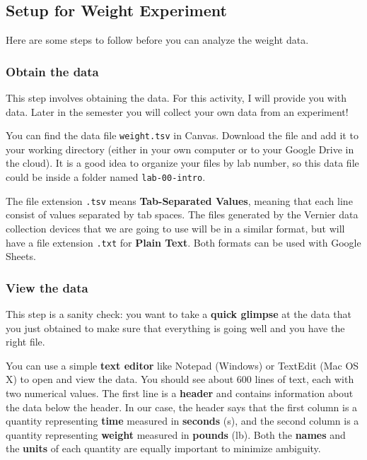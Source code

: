 \subsection{Setup for Weight Experiment}
Here are some steps to follow before you can analyze the weight data.
\subsubsection{Obtain the data}
This step involves obtaining the data. For this activity, I will provide you with data. Later in the semester you will collect your own data from an experiment!

You can find the data file \texttt{weight.tsv} in Canvas. Download the file and add it to your working directory (either in your own computer or to your Google Drive in the cloud). It is a good idea to organize your files by lab number, so this data file could be inside a folder named \texttt{lab-00-intro}.

The file extension \texttt{.tsv} means \textbf{Tab-Separated Values}, meaning that each line consist of values separated by tab spaces. The files generated by the Vernier data collection devices that we are going to use will be in a similar format, but will have a file extension \texttt{.txt} for \textbf{Plain Text}. Both formats can be used with Google Sheets.
\subsubsection{View the data}
This step is a sanity check: you want to take a \textbf{quick glimpse} at the data that you just obtained to make sure that everything is going well and you have the right file.

You can use a simple \textbf{text editor} like Notepad (Windows) or TextEdit (Mac OS X) to open and view the data. You should see about 600 lines of text, each with two numerical values. The first line is a \textbf{header} and contains information about the data below the header. In our case, the header says that the first column is a quantity representing \textbf{time} measured in \textbf{seconds} (s), and the second column is a quantity representing \textbf{weight} measured in \textbf{pounds} (lb). Both the \textbf{names} and the \textbf{units} of each quantity are equally important to minimize ambiguity.

